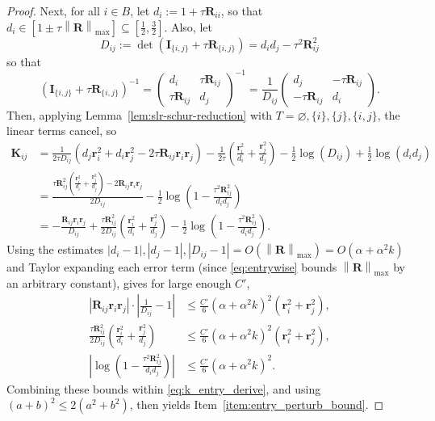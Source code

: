 \documentclass[11pt]{article}
\newcommand{\defeq}{:=}
\newcommand{\norm}[1]{\left\lVert#1\right\rVert}
\newcommand{\half}{\frac{1}{2}}
\newcommand{\1}{\mathbf{1}}
\newcommand{\0}{\mathbf{0}}
\newcommand{\id}{\mathbf{I}}
\newcommand{\Par}[1]{\left(#1\right)}
\newcommand{\Abs}[1]{\left|#1\right|}
\newcommand{\mk}{{\mathbf{K}}}
\newcommand{\mr}{{\mathbf{R}}}
\newcommand{\vr}{{\mathbf{r}}}
\renewcommand{\emptyset}{\varnothing}
\begin{document}
\begin{proof}
Next, for all $i \in B$, let $d_i \defeq 1 + \tau\mr_{ii}$, so that $d_i \in [1 \pm \tau\norm{\mr}_{\max}] \subseteq [\half, \frac 3 2]$. Also, let 
\[D_{ij} \defeq \det\Par{\id_{\{i, j\}} + \tau\mr_{\{i,j\}}} = d_id_j - \tau^2\mr^2_{ij}\]
so that
\[\Par{\id_{\{i, j\}} + \tau\mr_{\{i,j\}}}^{-1} = \begin{pmatrix} d_i & \tau\mr_{ij} \\ \tau\mr_{ij} & d_j \end{pmatrix}^{-1} = \frac{1}{D_{ij}}\begin{pmatrix} d_j & -\tau\mr_{ij} \\ -\tau\mr_{ij} & d_i \end{pmatrix}.\]
Then, applying Lemma~\ref{lem:slr-schur-reduction} with $T = \emptyset, \{i\}, \{j\}, \{i, j\}$, the linear terms cancel, so
\begin{equation}\label{eq:k_entry_derive}
\begin{aligned}\mk_{ij} &= \frac 1 {2\tau D_{ij}}\Par{d_j \vr_i^2 + d_i\vr_j^2 - 2\tau\mr_{ij}\vr_i\vr_j} - \frac 1 {2\tau}\Par{\frac{\vr_i^2}{d_i} + \frac{\vr_j^2}{d_j}} - \half\log\Par{D_{ij}} + \half\log\Par{d_id_j}
\\
&= \frac{\tau\mr_{ij}^2\Par{\frac{\vr_i^2}{d_i} + \frac{\vr_j^2}{d_j}} - 2\mr_{ij}\vr_i\vr_j}{2D_{ij}} - \half\log\Par{1 - \frac{\tau^2\mr_{ij}^2}{d_id_j}} \\
&= -\frac{\mr_{ij}\vr_i\vr_j}{D_{ij}} + \frac{\tau\mr_{ij}^2}{2D_{ij}}\Par
{\frac{\vr_i^2}{d_i} + \frac{\vr_j^2}{d_j}} - \half\log\Par{1 - \frac{\tau^2\mr_{ij}^2}{d_id_j}}.
\end{aligned}
\end{equation}
Using the estimates $|d_i - 1|, |d_j - 1|, |D_{ij} - 1| = O(\norm{\mr}_{\max}) = O(\alpha + \alpha^2 k)$ and Taylor expanding each error term (since \eqref{eq:entrywise} bounds $\norm{\mr}_{\max}$ by an arbitrary constant), gives for large enough $C'$,
\begin{align*}
\Abs{\mr_{ij}\vr_i\vr_j} \cdot \Abs{\frac 1 {D_{ij}} - 1} &\le \frac{C'}{6}\Par{\alpha + \alpha^2 k}^2\Par{\vr_i^2 + \vr_j^2},\\
\frac{\tau\mr_{ij}^2}{2D_{ij}}\Par
{\frac{\vr_i^2}{d_i}+ \frac{\vr_j^2}{d_j}} &\le \frac{C'}{6}\Par{\alpha + \alpha^2 k}^2\Par{\vr_i^2 + \vr_j^2},\\
\Abs{\log\Par{1 - \frac{\tau^2\mr_{ij}^2}{d_id_j}}} &\le \frac {C'} 6 \Par{\alpha + \alpha^2 k}^2.
\end{align*}
Combining these bounds within \eqref{eq:k_entry_derive}, and using $(a + b)^2 \le 2(a^2 + b^2)$, then yields Item~\ref{item:entry_perturb_bound}.


\end{proof}
\end{document}
